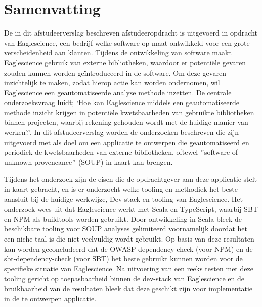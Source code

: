 


\chapter{Samenvatting}\label{ch:samenvatting}

De in dit afstudeerverslag beschreven afstudeeropdracht is uitgevoerd in opdracht van Eaglescience, een bedrijf welke software op maat ontwikkeld voor een grote verscheidenheid aan klanten. Tijdens de ontwikkeling van software maakt Eaglescience gebruik van externe bibliotheken, waardoor er potentiële gevaren zouden kunnen worden geïntroduceerd in de software. Om deze gevaren inzichtelijk te maken, zodat hierop actie kan worden ondernomen, wil Eaglescience een geautomatiseerde analyse methode inzetten. De centrale onderzoeksvraag luidt; ‘Hoe kan Eaglescience middels een geautomatiseerde methode inzicht krijgen in potentiële kwetsbaarheden van gebruikte bibliotheken binnen projecten, waarbij rekening gehouden wordt met de huidige manier van werken?’. In dit afstudeerverslag worden de onderzoeken beschreven die zijn uitgevoerd met als doel om een applicatie te ontwerpen die geautomatiseerd en periodiek de kwetsbaarheden van externe bibliotheken, oftewel $"$software of unknown provencance$"$ (SOUP) in kaart kan brengen.

Tijdens het onderzoek zijn de eisen die de opdrachtgever aan deze applicatie stelt in kaart gebracht, en is er onderzocht welke tooling en methodiek het beste aansluit bij de huidige werkwijze, Dev-stack en tooling van Eaglescience. Het onderzoek wees uit dat Eaglescience werkt met Scala en TypeScript, waarbij SBT en NPM als buildtools worden gebruikt. Door ontwikkeling in Scala bleek de beschikbare tooling voor SOUP analyses gelimiteerd voornamelijk doordat het een niche taal is die niet veelvuldig wordt gebruikt. Op basis van deze resultaten kan worden geconcludeerd dat de OWASP-dependency-check (voor NPM) en de sbt-dependency-check (voor SBT) het beste gebruikt kunnen worden voor de specifieke situatie van Eaglescience.
Na uitvoering van een reeks testen met deze tooling gericht op toepasbaarheid binnen de dev-stack van Eaglescience en de bruikbaarheid van de resultaten bleek dat deze geschikt zijn voor implementatie in de te ontwerpen applicatie.

